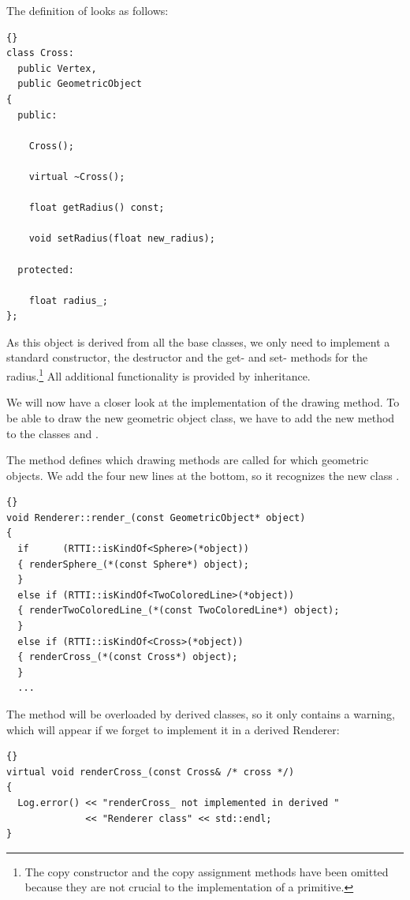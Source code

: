 The definition of  looks as follows:

\begin{lstlisting}{}
class Cross: 
  public Vertex,
  public GeometricObject
{
  public:

    Cross();

    virtual ~Cross();
		
    float getRadius() const;

    void setRadius(float new_radius);

  protected:
					
    float radius_;
};
\end{lstlisting}

\noindent
As this object is derived from all the base classes, we only need to implement
a standard constructor, the destructor and the get- and set- methods for 
the radius.\footnote{The copy constructor and the copy assignment methods
have been omitted because they are not crucial to the implementation of a
primitive.} All additional functionality is provided by inheritance.

We will now have a closer look at the implementation of the drawing method. 
To be able to draw the new geometric object class, we have to add the new
method  to the classes  and 
.

The method  defines which drawing methods are 
called for which geometric objects. We add the four new lines at the bottom, 
so it recognizes the new class .

\begin{lstlisting}{}
void Renderer::render_(const GeometricObject* object)
{
  if      (RTTI::isKindOf<Sphere>(*object))         
  { renderSphere_(*(const Sphere*) object);
  }
  else if (RTTI::isKindOf<TwoColoredLine>(*object)) 
  { renderTwoColoredLine_(*(const TwoColoredLine*) object);
  }
  else if (RTTI::isKindOf<Cross>(*object))          
  { renderCross_(*(const Cross*) object);
  }
  ...
\end{lstlisting}

The method  will be 
overloaded by derived  classes, so it only contains a 
warning, which will appear if we forget to implement it in a derived Renderer:

\begin{lstlisting}{}
virtual void renderCross_(const Cross& /* cross */)
{
  Log.error() << "renderCross_ not implemented in derived "
              << "Renderer class" << std::endl;
}
\end{lstlisting}

